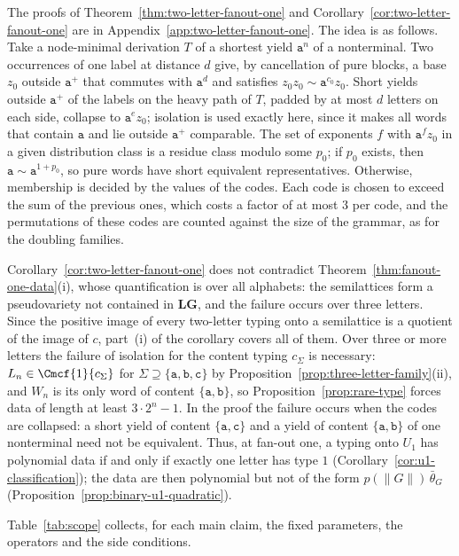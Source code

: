 The proofs of Theorem~\ref{thm:two-letter-fanout-one} and
Corollary~\ref{cor:two-letter-fanout-one} are in
Appendix~\ref{app:two-letter-fanout-one}.  The idea is as follows.  Take a
node-minimal derivation $T$ of a shortest yield $\mathtt a^n$ of a nonterminal.
Two occurrences of one label at distance $d$ give, by cancellation of pure
blocks, a base $z_0$ outside $\mathtt a^+$ that commutes with $\mathtt a^d$ and
satisfies $z_0z_0\sim\mathtt a^{c_0}z_0$.  Short yields outside $\mathtt a^+$ of the
labels on the heavy path of $T$, padded by at most $d$ letters on each side,
collapse to $\mathtt a^ez_0$; isolation is used exactly here, since it makes all
words that contain $\mathtt a$ and lie outside $\mathtt a^+$ comparable.  The
set of exponents $f$ with $\mathtt a^fz_0$ in a given distribution class is a
residue class modulo some $p_0$; if $p_0$ exists, then $\mathtt a\sim\mathtt
a^{1+p_0}$, so pure words have short equivalent representatives.  Otherwise,
membership is decided by the values of the codes.  Each code is chosen to exceed
the sum of the previous ones, which costs a factor of at most $3$ per code, and
the permutations of these codes are counted against the size of the grammar,
as for the doubling families.

Corollary~\ref{cor:two-letter-fanout-one} does not contradict
Theorem~\ref{thm:fanout-one-data}(i), whose quantification is over all
alphabets: the semilattices form a pseudovariety not contained in
$\mathbf{LG}$, and the failure occurs over three letters.  Since the positive
image of every two-letter typing onto a semilattice is a quotient of the image
of $c$, part~(i) of the corollary covers all of them.  Over three or more
letters the failure of isolation for the content typing $c_\Sigma$ is
necessary: $L_n\in\Cmcf{1}{c_\Sigma}$ for $\Sigma\supseteq\{\mathtt a,\mathtt b,\mathtt
c\}$ by Proposition~\ref{prop:three-letter-family}(ii), and $W_n$ is its only word
of content $\{\mathtt a,\mathtt b\}$, so Proposition~\ref{prop:rare-type} forces data
of length at least $3\cdot2^n-1$.  In the proof the failure occurs when the codes
are collapsed: a short yield of content $\{\mathtt a,\mathtt c\}$ and a yield of
content $\{\mathtt a,\mathtt b\}$ of one nonterminal need not be equivalent.
Thus, at fan-out one, a typing onto $U_1$ has polynomial data if and only if
exactly one letter has type $1$ (Corollary~\ref{cor:u1-classification}); the data
are then polynomial but not of the form $p(\|G\|)\,\bar\theta_G$
(Proposition~\ref{prop:binary-u1-quadratic}).

Table~\ref{tab:scope} collects, for each main claim, the fixed parameters,
the operators and the side conditions.

